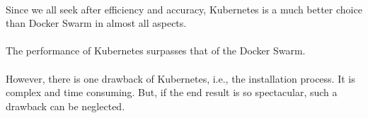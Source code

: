 \paragraph{\hspace{24pt}}
Since we all seek after efficiency and accuracy, Kubernetes is a much better choice than Docker Swarm in almost all aspects.

\paragraph{\hspace{24pt}}
The performance of Kubernetes surpasses that of the Docker Swarm.

\paragraph{\hspace{24pt}}
However, there is one drawback of Kubernetes, i.e., the installation process. It is complex and time consuming. But, if the end result is so spectacular, such a drawback can be neglected.